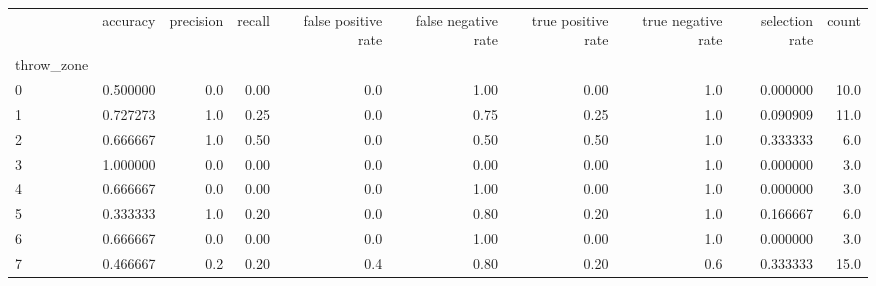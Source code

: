 \begin{tabular}{lrrrrrrrrr}
\toprule
{} &  accuracy &  precision &  recall &  false positive rate &  false negative rate &  true positive rate &  true negative rate &  selection rate &  count \\
throw\_zone &           &            &         &                      &                      &                     &                     &                 &        \\
\midrule
0          &  0.500000 &        0.0 &    0.00 &                  0.0 &                 1.00 &                0.00 &                 1.0 &        0.000000 &   10.0 \\
1          &  0.727273 &        1.0 &    0.25 &                  0.0 &                 0.75 &                0.25 &                 1.0 &        0.090909 &   11.0 \\
2          &  0.666667 &        1.0 &    0.50 &                  0.0 &                 0.50 &                0.50 &                 1.0 &        0.333333 &    6.0 \\
3          &  1.000000 &        0.0 &    0.00 &                  0.0 &                 0.00 &                0.00 &                 1.0 &        0.000000 &    3.0 \\
4          &  0.666667 &        0.0 &    0.00 &                  0.0 &                 1.00 &                0.00 &                 1.0 &        0.000000 &    3.0 \\
5          &  0.333333 &        1.0 &    0.20 &                  0.0 &                 0.80 &                0.20 &                 1.0 &        0.166667 &    6.0 \\
6          &  0.666667 &        0.0 &    0.00 &                  0.0 &                 1.00 &                0.00 &                 1.0 &        0.000000 &    3.0 \\
7          &  0.466667 &        0.2 &    0.20 &                  0.4 &                 0.80 &                0.20 &                 0.6 &        0.333333 &   15.0 \\
\bottomrule
\end{tabular}
